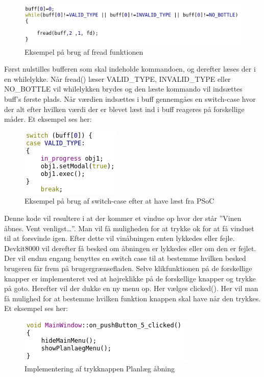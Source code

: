 \begin{figure}[H]
	\centering
\includegraphics{Billeder/read}
\caption{Eksempel på brug af fread funktionen}
\end{figure}

Først nulstilles bufferen som skal indeholde kommandoen, og derefter læses der i en whilelykke. Når fread() læser VALID{\_}TYPE, INVALID{\_}TYPE eller NO{\_}BOTTLE vil whilelykken brydes og den læste kommando vil indsættes buff’s første plads. Når værdien indsættes i buff gennemgåes en switch-case hvor der alt efter hvilken værdi der er blevet læst ind i buff reageres på forskellige måder. Et eksempel ses her:

\begin{figure}[H]
	\centering
\includegraphics{Billeder/switch}
\caption{Eksempel på brug af switch-case efter at have læst fra PSoC}
\end{figure}

Denne kode vil resultere i at der kommer et vindue op hvor der står ”Vinen åbnes. Vent venligst…”. Man vil få muligheden for at trykke ok for at få vinduet til at forsvinde igen. 
Efter dette vil vinåbningen enten lykkedes eller fejle. Devkit8000 vil derefter få besked om åbningen er lykkedes eller om den er fejlet. Der vil endnu engang benyttes en switch case til at bestemme hvilken besked brugeren får frem på brugergrænsefladen.
Selve klikfunktionen på de forskellige knapper er implementeret ved at højreklikke på de forskellige knapper og trykke på goto. Herefter vil der dukke en ny menu op. Her vælges clicked(). Her vil man få mulighed for at bestemme hvilken funktion knappen skal have når den trykkes. Et eksempel ses her:

\begin{figure}[H]
	\centering
\includegraphics{Billeder/pushButton}
\caption{Implementering af trykknappen Planlæg åbning}
\end{figure}


